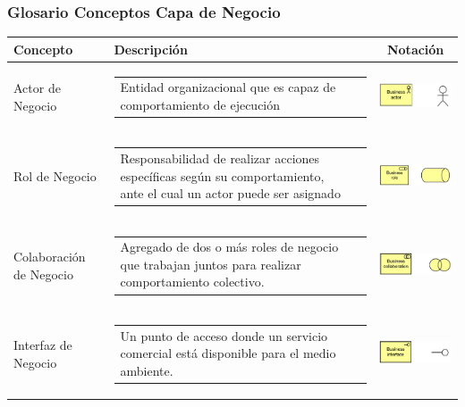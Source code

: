 \newpage

\subsubsection{Glosario Conceptos Capa de Negocio}

\begin{longtable}[c]{|p{2.5cm}|l|c|}
	
	\hline
	\textbf{Concepto} 			& \textbf{Descripción}                                                                                                                                            & \textbf{Notación} \\ \hline
	\endhead
	Actor de Negocio  			& \begin{tabular}[c]{p{7cm}@{}l@{}}Entidad organizacional que es capaz de comportamiento de ejecución\end{tabular}                                                    & \includegraphics[width=35mm]{arquitectura/adm_lenguaje/imgs/business/BusinessActor}           \\ \hline
	Rol de Negocio    			& \begin{tabular}[c]{p{7cm}@{}l@{}}Responsabilidad de realizar acciones específicas según su comportamiento, ante el cual un actor puede ser asignado\end{tabular} & \includegraphics[width=35mm]{arquitectura/adm_lenguaje/imgs/business/BusinessRole}          \\ \hline
	Colaboración de Negocio  	& \begin{tabular}[c]{p{7cm}@{}l@{}}Agregado de dos o más roles de negocio que trabajan juntos para realizar comportamiento colectivo.\end{tabular} & \includegraphics[width=35mm]{arquitectura/adm_lenguaje/imgs/business/BusinessCollaboration}          \\ \hline
	Interfaz de Negocio    		& \begin{tabular}[c]{p{7cm}@{}l@{}}Un punto de acceso donde un servicio comercial está disponible para el medio ambiente.\end{tabular} & \includegraphics[width=35mm]{arquitectura/adm_lenguaje/imgs/business/BusinessInterface}          \\ \hline

\end{longtable}
